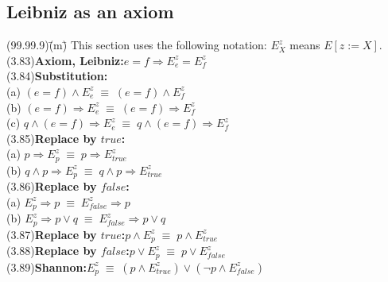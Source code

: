 \documentclass[fleqn, leqno]{article}
\newcommand{\lgap}{2pt}                             %
\newcommand{\equivs}{\ensuremath{\;\equiv\;}}       %
\newcommand{\impl}{\ensuremath{\Rightarrow}}        %
\begin{document}
\subsection*{Leibniz as an axiom}
\begin{tabbing}
(99.99.9)\;\=(m)\;\=\kill
This section uses the following notation: $E^{z}_{X}$ means $E[z := X]$.\\[\lgap]
(3.83)\>\textbf{Axiom, Leibniz:}\quad $e=f\impl E^{z}_{e} = E^{z}_{f}$\\[\lgap]
(3.84)\>\textbf{Substitution:}\\
      \> (a)\> $(e=f) \land E^{z}_{e} \equivs (e=f)\land E^{z}_{f}$\\[\lgap]
      \> (b)\> $(e=f) \impl E^{z}_{e} \equivs (e=f)\impl E^{z}_{f}$\\[\lgap]
      \> (c)\> $q\land (e=f) \impl E^{z}_{e} \equivs q\land (e=f)\impl E^{z}_{f}$\\[\lgap]
(3.85)\>\textbf{Replace by $true$:}\\
      \> (a)\> $p \impl E^{z}_{p} \equivs p\impl E^{z}_{true}$\\[\lgap]
      \> (b)\> $q\land p \impl E^{z}_{p} \equivs q\land p\impl E^{z}_{true}$\\[\lgap]
(3.86)\>\textbf{Replace by $false$:}\\
      \> (a)\> $E^{z}_{p} \impl p \equivs E^{z}_{false}\impl p$\\[\lgap]
      \> (b)\> $E^{z}_{p} \impl p\lor q \equivs E^{z}_{false}\impl p\lor q$\\[\lgap]
(3.87)\>\textbf{Replace by $true$:}\quad $p\land E^{z}_{p} \equivs p\land E^{z}_{true}$\\[\lgap]
(3.88)\>\textbf{Replace by $false$:}\quad $p\lor E^{z}_{p} \equivs p\lor E^{z}_{false}$\\[\lgap]
(3.89)\>\textbf{Shannon:}\quad $E^{z}_{p}\equivs (p\land E^{z}_{true}) \lor (\neg p\land E^{z}_{false})$\\
\end{tabbing}
\end{document}
